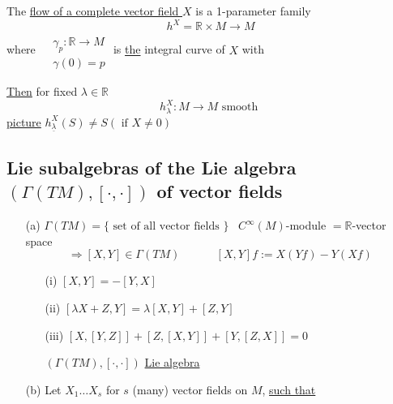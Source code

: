 \begin{definition} The \underline{flow of a complete vector field $X$} is a 1-parameter family
\[
h^X = \mathbb{R}\times M \to M
\]
where $\begin{aligned} & \quad \\ 
  & \gamma_p : \mathbb{R} \to M \\
  & \gamma(0) = p \end{aligned}$ is \underline{the} integral curve of $X$ with 

\underline{Then} for fixed $\lambda \in \mathbb{R}$ 
\[
h_{\lambda}^X : M \to M \text{ smooth }
\]
\underline{picture}  $h^X_{\underline{\lambda}}(S) \neq S (\text{ if } X \neq 0 )$
\end{definition}

\subsection{Lie subalgebras of the Lie algebra $(\Gamma(TM) , [ \cdot , \cdot ] )$ of vector fields}

\begin{enumerate}
  \item[(a)] $\Gamma(TM) = \lbrace \text{ set of all vector fields } \rbrace$ \quad \, $C^{\infty}(M)$-module $ = \mathbb{R}$-vector space \[
\Longrightarrow [X,Y] \in \Gamma(TM) \quad \quad \quad \, [X,Y] f := X(Yf) - Y(Xf)
\]
\begin{enumerate}
\item[(i)] $[X,Y] = -[Y,X]$ 
\item[(ii)] $[\lambda X + Z, Y] = \lambda [X,Y] + [Z,Y]$
\item[(iii)] $[X,[Y,Z]]  + [Z,[X,Y]] + [Y,[Z,X]] =0$ 

$(\Gamma(TM), [\cdot, \cdot])$ \underline{Lie algebra}
\end{enumerate}
\item[(b)] Let $X_1\dots X_s$ for $s$ (many) vector fields on $M$, \underline{such that}
\end{enumerate}

